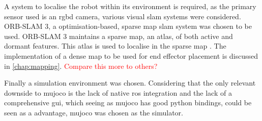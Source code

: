 A system to localise the robot within its environment is required, as the primary sensor used is an \ac{rgbd} camera, various visual \ac{slam} systems were considered. ORB-SLAM 3, a optimisation-based, sparse map \ac{slam} system was chosen to be used. ORB-SLAM 3 maintains a sparse map, an atlas, of both active and dormant features. This atlas is used to localise in the sparse map \citep{macario2022comprehensive}. The implementation of a dense map to be used for end effector placement is discussed in \autoref{chap:mapping}. \textcolor{red}{Compare this more to others?}

Finally a simulation environment was chosen. Considering that the only relevant downside to \ac{mujoco} is the lack of native \ac{ros} integration and the lack of a comprehensive \ac{gui}, which seeing as \ac{mujoco} has good python bindings, could be seen as a advantage, \ac{mujoco} was chosen as the simulator.
